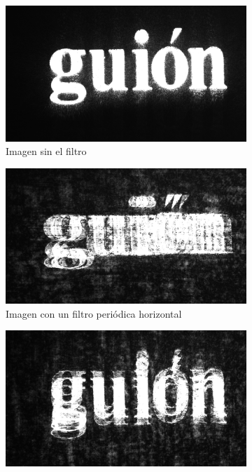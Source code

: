 \documentclass{./packages/optica-article}
\begin{document}
\begin{figure}[hptb]
	\begin{center}
		\begin{subfigure}[t]{0.3\textwidth}\centering
			\includegraphics[width=\textwidth]{talbot-4f/letters-guion-nothing-in-middle}
			\caption{Imagen sin el filtro}
			\label{fig:filtrado:talbot:1}
		\end{subfigure}
		\quad
		\begin{subfigure}[t]{0.3\textwidth}\centering
			\includegraphics[width=\textwidth]{talbot-4f/letters-guion-horizontal-grading}
			\caption{Imagen con un filtro periódica horizontal}
			\label{fig:filtrado:talbot:2}
		\end{subfigure}
		\quad
		\begin{subfigure}[t]{0.3\textwidth}\centering
			\includegraphics[width=\textwidth]{talbot-4f/letters-guion-vertical-grading}

\end{subfigure}
\end{center}
\end{figure}
\end{document}

